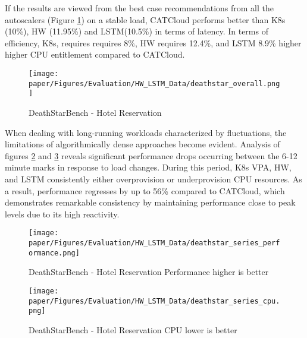 If the results are viewed from the best case recommendations from all the autoscalers (Figure \ref{deathstar_overall}) on a stable load, CATCloud performs better than K8s (10\%), HW (11.95\%) and LSTM(10.5\%) in terms of latency. In terms of efficiency, K8s, requires requires 8\%, HW requires 12.4\%, and LSTM 8.9\% higher higher CPU entitlement compared to CATCloud.

\begin{figure}[h]
  \centering
  \texttt{[image: paper/Figures/Evaluation/HW\_LSTM\_Data/deathstar\_overall.png]}
  \caption{DeathStarBench - Hotel Reservation}\label{deathstar_overall}
  \end{figure}

When dealing with long-running workloads characterized by fluctuations, the limitations of algorithmically dense approaches become evident. Analysis of figures \ref{deathstar_perf} and \ref{deathstar_cpu} reveals significant performance drops occurring between the 6-12 minute marks in response to load changes. During this period, K8s VPA, HW, and LSTM consistently either overprovision or underprovision CPU resources. As a result, performance regresses by up to 56\% compared to CATCloud, which demonstrates remarkable consistency by maintaining performance close to peak levels due to its high reactivity.

\begin{figure}[h]
  \centering
  \texttt{[image: paper/Figures/Evaluation/HW\_LSTM\_Data/deathstar\_series\_performance.png]}
  \caption{DeathStarBench - Hotel Reservation Performance higher is better}\label{deathstar_perf}
  \end{figure}

\begin{figure}[h]
  \centering
  \texttt{[image: paper/Figures/Evaluation/HW\_LSTM\_Data/deathstar\_series\_cpu.png]}
  \caption{DeathStarBench - Hotel Reservation CPU lower is better}\label{deathstar_cpu}
  \end{figure}





